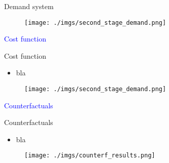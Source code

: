 \documentclass[notes,11pt, aspectratio=169]{beamer}
\begin{document}
\begin{frame}{Demand system}\label{demand}
    \vspace{0.5cm}
      
        \begin{figure}[t*]
          \centering
    
          \texttt{[image: ./imgs/second\_stage\_demand.png]}
       
        \end{figure}

        \hyperlink{firststage}{}
        
      \end{frame}

\begin{frame}
    \textcolor{blue}{\huge{\centerline{Cost function}}}
\end{frame}

\begin{frame}{Cost function}\label{cost}
    \vspace{0.5cm}
      \begin{itemize}
        \item  bla
      \end{itemize}
      
        \begin{figure}[t*]
          \centering
    
          \texttt{[image: ./imgs/second\_stage\_demand.png]}
        \end{figure}

        \hyperlink{costiv}{}
        
      \end{frame}

\begin{frame}
    \textcolor{blue}{\huge{\centerline{Counterfactuals}}}
\end{frame}

\begin{frame}{Counterfactuals}
    \vspace{0.5cm}
      \begin{itemize}
        \item  bla
      \end{itemize}
      
        \begin{figure}[t*]
          \centering
    
          \texttt{[image: ./imgs/counterf\_results.png]}
        \end{figure}
        
      \end{frame}
\end{document}
